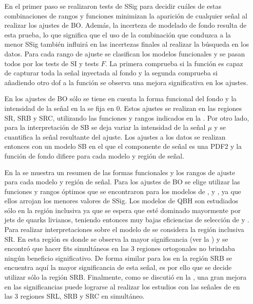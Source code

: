 En el primer paso se realizaron tests de \ac{SSig} para decidir cuáles de estas combinaciones de rangos y funciones minimizan la aparición de cualquier señal al realizar los ajustes de \ac{BO}. Además, la incerteza de modelado de fondo resulta de esta prueba, lo que significa que el uso de la combinación que conduzca a la menor \ac{SSig} también influirá en las incertezas finales al realizar la búsqueda en los datos. Para cada rango de ajuste se clasifican los modelos funcionales y se pasan todos por los tests de \ac{SI} y tests \(F\). La primera comprueba si la función es capaz de capturar toda la señal inyectada al fondo y la segunda comprueba si añadiendo otro \ac{dof} a la función se observa una mejora significativa en los ajustes.

En los ajustes de \ac{BO} sólo se tiene en cuenta la forma funcional del fondo y la intensidad de la señal en la \Eqn{\ref{eq:strategy:stat_treatment:stat_model:likelihood}} se fija en 0. Estos ajustes se realizan en las regiones SR, SRB y SRC, utilizando las funciones y rangos indicados en la \Tab{\ref{tab:bkg:modeling:strategy_modeling:summary}}.
Por otro lado, para la interpretación de \ac{SB} se deja variar la intensidad de la señal \(\mu\) y se cuantifica la señal resultante del ajuste. Los ajustes a los datos se realizan entonces con un modelo \ac{SB} en el que el componente de señal es una \ac{PDF2} y la función de fondo difiere para cada modelo y región de señal.

En la \Tab{\ref{tab:bkg:modeling:strategy_modeling:summary}} se muestra un resumen de las formas funcionales y los rangos de ajuste para cada modelo y región de señal. Para los ajustes de \ac{BO} se elige utilizar las funciones y rangos óptimos que se encontraron para los modelos de \qstar, \bstar y \cstar, ya que ellos arrojan los menores valores de \ac{SSig}. 
Los modelos de \ac{QBH} son estudiados sólo en la región inclusiva ya que se espera que esté dominado mayormente por jets de quarks livianos, teniendo entonces muy bajas eficiencias de selección de \bjets y \cjets.
Para realizar interpretaciones sobre el modelo de \qstar se considera la región inclusiva SR. En esta región es donde se observa la mayor significancia (ver la \Tab{\ref{tab:signals:acc_eff:qstar_signficances}}) y se encontró que hacer fits simultáneos en las 3 regiones ortogonales no brindaba ningún beneficio significativo. De forma similar para los \bstar en la región SRB se encuentra aquí la mayor significancia de esta señal, es por ello que se decide utilizar sólo la región SRB. Finalmente, como se discutió en la \Sect{\ref{sec:signals:acc_eff}}, una gran mejora en las significancias puede lograrse al realizar los estudios con las señales de \cstar en las 3 regiones SRL, SRB y SRC en simultáneo.


